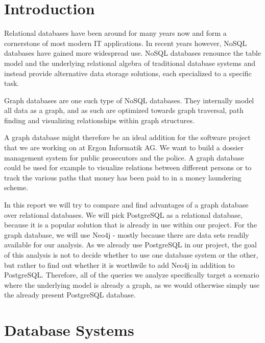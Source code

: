 \documentclass[11pt, a4paper,oneside,chapterprefix=false]{scrbook}
\begin{document}
\tableofcontents

\mainmatter

\chapter{Introduction} \label{chp:introduction}

Relational databases have been around for many years now and form a cornerstone of most modern IT applications.
In recent years however, NoSQL databases have gained more widespread use.
NoSQL databases renounce the table model and the underlying relational algebra of traditional database systems and instead provide alternative data storage solutions, each specialized to a specific task.

Graph databases are one such type of NoSQL databases.
They internally model all data as a graph, and as such are optimized towards graph traversal, path finding and visualizing relationships within graph structures.

A graph database might therefore be an ideal addition for the software project that we are working on at Ergon Informatik AG.
We want to build a dossier management system for public prosecutors and the police.
A graph database could be used for example to visualize relations between different persons or to track the various paths that money has been paid to in a money laundering scheme.

In this report we will try to compare and find advantages of a graph database over relational databases.
We will pick PostgreSQL as a relational database, because it is a popular solution that is already in use within our project.
For the graph database, we will use Neo4j - mostly because there are data sets readily available for our analysis.
As we already use PostgreSQL in our project, the goal of this analysis is not to decide whether to use one database system or the other, but rather to find out whether it is worthwile to add Neo4j in addition to PostgreSQL.
Therefore, all of the queries we analyze specifically target a scenario where the underlying model is already a graph, as we would otherwise simply use the already present PostgreSQL database.

\chapter{Database Systems} \label{chp:theory}
\end{document}
